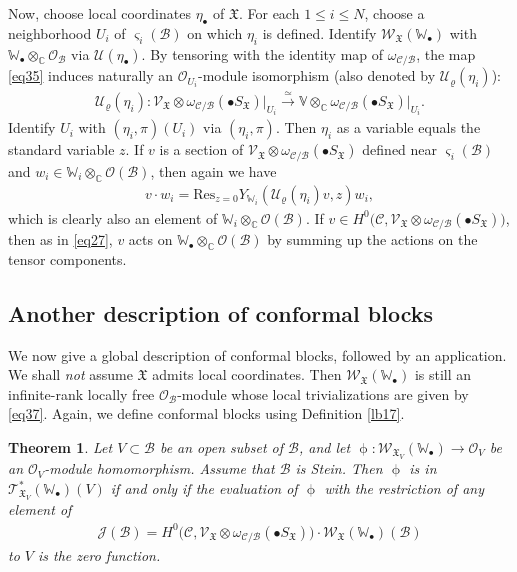\documentclass[11pt,b5paper,notitlepage]{article}
\theoremstyle{definition}
\theoremstyle{plain}
\newtheorem{thm}[df]{Theorem}
\newcommand{\fk}{\mathfrak}
\newcommand{\mc}{\mathcal}
\newcommand{\Res}{\mathrm{Res}}
\newcommand{\scr}{\mathscr}
\newcommand{\sgm}{\varsigma}
\newcommand{\SX}{S_{\fk X}}
\newcommand{\blt}{\bullet}
\newcommand{\Vbb}{\mathbb V}
\newcommand{\Wbb}{\mathbb W}
\newcommand{\Cbb}{\mathbb C}
\numberwithin{equation}{section}
\begin{document}
Now, choose local coordinates $\eta_\blt$ of $\fk X$. For each $1\leq i\leq N$, choose a neighborhood $U_i$ of $\sgm_i(\mc B)$ on which $\eta_i$ is defined. Identify $\scr W_{\fk X}(\Wbb_\blt)$ with $\Wbb_\blt\otimes_\Cbb\scr O_{\mc B}$ via $\mc U(\eta_\blt)$. By tensoring with the identity map of $\omega_{\mc C/\mc B}$,  the map \eqref{eq35} induces naturally an $\scr O_{U_i}$-module isomorphism (also denoted by $\mc U_\varrho(\eta_i)$):
\begin{align*}
\mc U_\varrho(\eta_i):\scr V_{\fk X}\otimes\omega_{\mc C/\mc B}(\blt S_{\fk X})\big|_{U_i}\xrightarrow{\simeq}\Vbb\otimes_{\Cbb}\omega_{\mc C/\mc B}(\blt S_{\fk X})\big|_{U_i}.
\end{align*}
Identify $U_i$ with $(\eta_i,\pi)(U_i)$ via $(\eta_i,\pi)$. Then $\eta_i$ as a variable equals the standard variable $z$. If $v$ is a section of $\scr V_{\fk X}\otimes\omega_{\mc C/\mc B}(\blt S_{\fk X})$ defined near $\sgm_i(\mc B)$ and $w_i\in\Wbb_i\otimes_\Cbb\scr O(\mc B)$,  \index{vw@$v\cdot w_i,v\cdot w_\blt$}   then again we have
\begin{align}
v\cdot w_i=\Res_{z=0}Y_{\Wbb_i}(\mc U_\varrho(\eta_i)v,z)w_i,\label{eq55}
\end{align}
which is clearly also an element of $\Wbb_i\otimes_\Cbb\scr O(\mc B)$. If $v\in H^0\big(\mc C,\scr V_{\fk X}\otimes\omega_{\mc C/\mc B}(\blt\SX)\big)$, then as in \eqref{eq27}, $v$ acts on $\Wbb_\blt\otimes_\Cbb\scr O(\mc B)$ by summing up the actions on the tensor components.


\subsection*{Another description of conformal blocks}

We now give a global description of conformal blocks, followed by an application. We shall \emph{not} assume $\fk X$ admits local coordinates. Then $\scr W_{\fk X}(\Wbb_\blt)$ is still an infinite-rank locally free $\scr O_{\mc B}$-module whose local trivializations are given by \eqref{eq37}. Again, we define conformal blocks using Definition \ref{lb17}.


\begin{thm}\label{lb18}
Let $V\subset \mc B$ be an open subset of $\mc B$, and let $\upphi:\scr W_{\fk X_V}(\Wbb_\blt)\rightarrow\scr O_V$ be an $\scr O_V$-module homomorphism. Assume that $\mc B$ is Stein. Then $\upphi$ is in $\scr T_{\fk X_V}^*(\Wbb_\blt)(V)$ if and only if the  evaluation of $\upphi$ with the restriction  of any element \index{JB@$\scr J(\mc B)$} of 
\begin{align}
\scr J(\mc B)=H^0\big(\mc C,\scr V_{\fk X}\otimes\omega_{\mc C/\mc B}(\blt\SX)\big)\cdot \scr W_{\fk X}(\Wbb_\blt)(\mc B)\label{eq51}
\end{align}
to $V$ is the zero function.
\end{thm}
\end{document}
